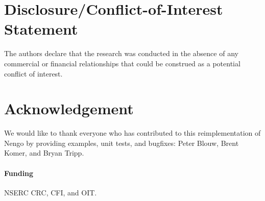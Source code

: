 \documentclass{frontiersSCNS}
\begin{document}
\section*{Disclosure/Conflict-of-Interest Statement}

The authors declare that the research was conducted in the absence of
any commercial or financial relationships that could be construed as a
potential conflict of interest.

\section*{Acknowledgement}

We would like to thank
everyone who has contributed
to this reimplementation of Nengo
by providing examples,
unit tests, and bugfixes:
Peter Blouw, Brent Komer, and Bryan Tripp.

\paragraph{Funding\textcolon}
NSERC CRC, CFI, and OIT.



\end{document}
